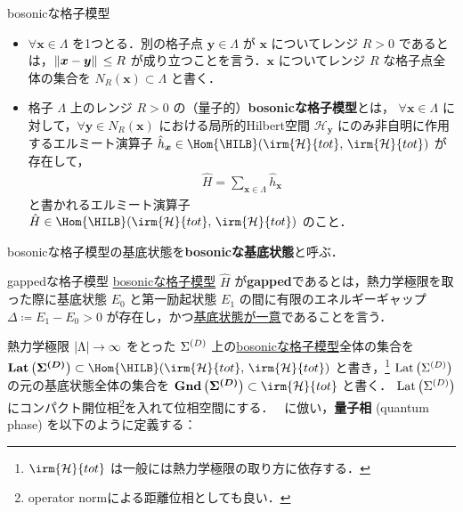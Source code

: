 \documentclass[TQFT_main]{subfiles}
\begin{document}
\begin{mydef}[label=def:bosonic-lattice-model]{bosonicな格子模型}
    \begin{itemize}
        \item $\forall \bm{x} \in \Lambda$ を1つとる．別の格子点 $\bm{y} \in \Lambda$ が $\bm{x}$ についてレンジ $R > 0$ であるとは，$\norm*{\bm{x} - \bm{y}} \le R$ が成り立つことを言う．$\bm{x}$ についてレンジ $R$ な格子点全体の集合を $N_R (\bm{x}) \subset \Lambda$ と書く．
        \item 格子 $\Lambda$ 上のレンジ $R > 0$ の（量子的）\textbf{bosonicな格子模型}とは，
        $\forall \bm{x} \in \Lambda$ に対して，$\forall \bm{y} \in N_R(\bm{x})$ における局所的Hilbert空間 $\mathcal{H}_{\bm{y}}$ にのみ非自明に作用するエルミート演算子 $\hat{h}_{\bm{x}} \in \Hom{\HILB} (\irm{\mathcal{H}}{tot},\, \irm{\mathcal{H}}{tot})$ が存在して，
        \begin{align}
            \hat{H} = \sum_{\bm{x} \in \Lambda} \hat{h}_{\bm{x}}
        \end{align}
        と書かれるエルミート演算子 $\hat{H} \in \Hom{\HILB} (\irm{\mathcal{H}}{tot},\, \irm{\mathcal{H}}{tot})$ のこと．
    \end{itemize}
    
    \tcblower

    bosonicな格子模型の基底状態を\textbf{bosonicな基底状態}と呼ぶ．
\end{mydef}

\begin{mydef}[label=def:gapped]{gappedな格子模型}
    \hyperref[def:bosonic-lattice-model]{bosonicな格子模型} $\hat{H}$ が\textbf{gapped}であるとは，熱力学極限を取った際に基底状態 $E_0$ と第一励起状態 $E_1$ の間に有限のエネルギーギャップ $\Delta \coloneqq E_1 - E_0 > 0$ が存在し，かつ\underline{基底状態が一意}であることを言う．
\end{mydef}

熱力学極限 $\abs{\Lambda} \to \infty$ をとった $\Sigma^{(D)}$ 上の\hyperref[def:bosonic-lattice-model]{bosonicな格子模型}全体の集合を $\bm{\Lat{\mfd{\Sigma}{D}}} \subset \Hom{\HILB} (\irm{\mathcal{H}}{tot},\, \irm{\mathcal{H}}{tot})$ と書き，\footnote{$\irm{\mathcal{H}}{tot}$ は一般には熱力学極限の取り方に依存する．}
$\mathrm{Lat}\left(\Sigma^{(D)}\right)$ の元の基底状態全体の集合を $\bm{\Gnd{\mfd{\Sigma}{D}}} \subset \irm{\mathcal{H}}{tot}$ と書く．
$\mathrm{Lat}\left(\Sigma^{(D)}\right)$ にコンパクト開位相\footnote{operator normによる距離位相としても良い．}を入れて位相空間にする．
~\cite[p.3]{ChenGuWen2010}に倣い，\textbf{量子相} (quantum phase) を以下のように定義する：
\end{document}
